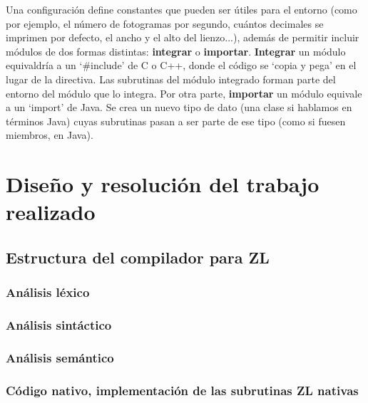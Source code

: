 \documentclass{report}
\begin{document}
	\vspace{10px}
	
	Una configuración define constantes que pueden ser útiles para el entorno (como por ejemplo, el número de fotogramas por segundo, cuántos decimales se imprimen por defecto, el ancho y el alto del lienzo...), además de permitir incluir módulos de dos formas distintas: \textbf{integrar} o \textbf{importar}. \textbf{Integrar} un módulo equivaldría a un `\#include' de C o C++, donde el código se `copia y pega' en el lugar de la directiva. Las subrutinas del módulo integrado forman parte del entorno del módulo que lo integra. Por otra parte, \textbf{importar} un módulo equivale a un `import' de Java. Se crea un nuevo tipo de dato (una clase si hablamos en términos Java) cuyas subrutinas pasan a ser parte de ese tipo (como si fuesen miembros, en Java).
	
	\vspace{10px}
	
		
	\chapter{Diseño y resolución del trabajo realizado}
	
	\section{Estructura del compilador para ZL}
	
	
	
	\subsection{Análisis léxico}
	
	\subsection{Análisis sintáctico}
	
	\subsection{Análisis semántico}
	
	\subsection{Código nativo, implementación de las subrutinas ZL nativas}
	
\end{document}

